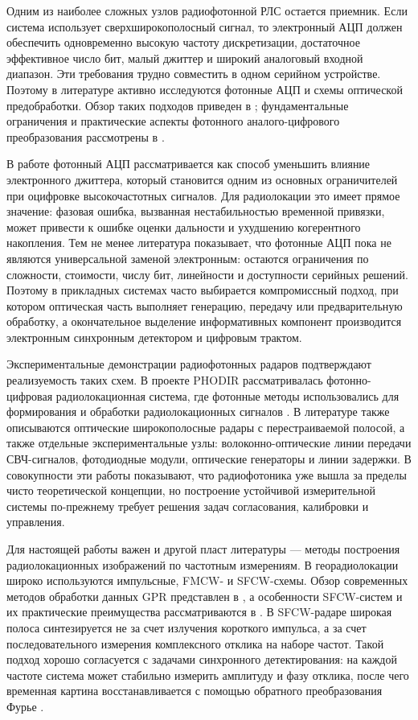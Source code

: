 Одним из наиболее сложных узлов радиофотонной РЛС остается приемник. Если
система использует сверхширокополосный сигнал, то электронный АЦП должен обеспечить
одновременно высокую частоту дискретизации, достаточное эффективное число бит,
малый джиттер и широкий аналоговый входной диапазон. Эти требования трудно
совместить в одном серийном устройстве. Поэтому в литературе активно исследуются
фотонные АЦП и схемы оптической предобработки. Обзор таких подходов приведен в
\cite{starikov2015photonicadc}; фундаментальные ограничения и практические аспекты
фотонного аналого-цифрового преобразования рассмотрены в \cite{valley2007photonicadc}.

В работе \cite{khilo2012photonicadc} фотонный АЦП рассматривается как способ
уменьшить влияние электронного джиттера, который становится одним из основных
ограничителей при оцифровке высокочастотных сигналов. Для радиолокации это имеет
прямое значение: фазовая ошибка, вызванная нестабильностью временной привязки,
может привести к ошибке оценки дальности и ухудшению когерентного накопления.
Тем не менее литература показывает, что фотонные АЦП пока не являются универсальной
заменой электронным: остаются ограничения по сложности, стоимости, числу бит,
линейности и доступности серийных решений. Поэтому в прикладных системах часто
выбирается компромиссный подход, при котором оптическая часть выполняет генерацию,
передачу или предварительную обработку, а окончательное выделение информативных
компонент производится электронным синхронным детектором и цифровым трактом.

Экспериментальные демонстрации радиофотонных радаров подтверждают реализуемость
таких схем. В проекте PHODIR рассматривалась фотонно-цифровая радиолокационная
система, где фотонные методы использовались для формирования и обработки
радиолокационных сигналов \cite{phodir2016}. В литературе также описываются
оптические широкополосные радары с перестраиваемой полосой, а также отдельные
экспериментальные узлы: волоконно-оптические линии передачи СВЧ-сигналов,
фотодиодные модули, оптические генераторы и линии задержки. В совокупности эти
работы показывают, что радиофотоника уже вышла за пределы чисто теоретической
концепции, но построение устойчивой измерительной системы по-прежнему требует
решения задач согласования, калибровки и управления.

Для настоящей работы важен и другой пласт литературы --- методы построения
радиолокационных изображений по частотным измерениям. В георадиолокации широко
используются импульсные, FMCW- и SFCW-схемы. Обзор современных методов обработки
данных GPR представлен в \cite{sun2019advanced}, а особенности SFCW-систем и их
практические преимущества рассматриваются в \cite{eide2019advanced}. В SFCW-радаре
широкая полоса синтезируется не за счет излучения короткого импульса, а за счет
последовательного измерения комплексного отклика на наборе частот. Такой подход
хорошо согласуется с задачами синхронного детектирования: на каждой частоте система
может стабильно измерить амплитуду и фазу отклика, после чего временная картина
восстанавливается с помощью обратного преобразования Фурье \cite{noon1996stepped}.

